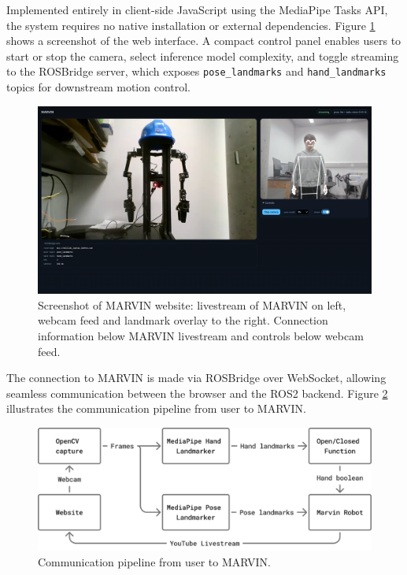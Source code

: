 \documentclass[acmsmall, screen]{acmart}
\begin{document}
Implemented entirely in client-side JavaScript using the MediaPipe Tasks API, the system requires no native installation or external dependencies. Figure \ref{fig:web} shows a screenshot of the web interface. A compact control panel enables users to start or stop the camera, select inference model complexity, and toggle streaming to the ROSBridge server, which exposes \texttt{pose\_landmarks} and \texttt{hand\_landmarks} topics for downstream motion control.

\begin{figure}[htbp]
  \centering
  \includegraphics[width=.8\linewidth]{assets/web} %
  \caption{Screenshot of MARVIN website: livestream of MARVIN on left, webcam feed and landmark overlay to the right. Connection information below MARVIN livestream and controls below webcam feed.}
  \label{fig:web}
\end{figure}

The connection to MARVIN is made via ROSBridge over WebSocket, allowing seamless communication between the browser and the ROS2 backend. 
Figure \ref{fig:pipeline} illustrates the communication pipeline from user to MARVIN.

\begin{figure}[htbp]
  \centering
  \includegraphics[width=.8\linewidth]{assets/MARVIN Communication Pipeline}
  \caption{Communication pipeline from user to MARVIN.}
  \label{fig:pipeline}
\end{figure}
\end{document}
